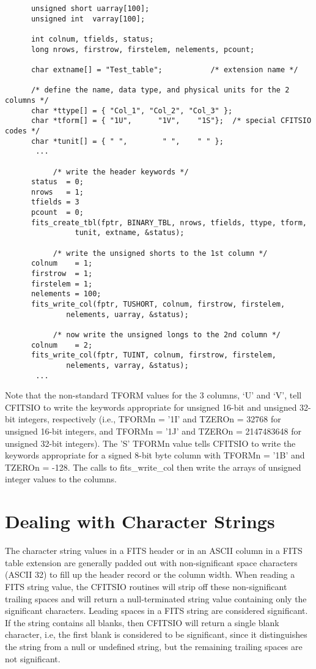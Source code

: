 \documentclass[11pt]{book}
\begin{document}
\begin{verbatim}
      unsigned short uarray[100];
      unsigned int  varray[100];

      int colnum, tfields, status;
      long nrows, firstrow, firstelem, nelements, pcount;

      char extname[] = "Test_table";           /* extension name */

      /* define the name, data type, and physical units for the 2 columns */
      char *ttype[] = { "Col_1", "Col_2", "Col_3" };
      char *tform[] = { "1U",      "1V",    "1S"};  /* special CFITSIO codes */
      char *tunit[] = { " ",        " ",    " " };
       ...

           /* write the header keywords */
      status  = 0;
      nrows   = 1;
      tfields = 3
      pcount  = 0;
      fits_create_tbl(fptr, BINARY_TBL, nrows, tfields, ttype, tform,
                tunit, extname, &status);

           /* write the unsigned shorts to the 1st column */
      colnum    = 1;
      firstrow  = 1;
      firstelem = 1;
      nelements = 100;
      fits_write_col(fptr, TUSHORT, colnum, firstrow, firstelem,
              nelements, uarray, &status);

           /* now write the unsigned longs to the 2nd column */
      colnum    = 2;
      fits_write_col(fptr, TUINT, colnum, firstrow, firstelem,
              nelements, varray, &status);
       ...
\end{verbatim}
Note that the non-standard TFORM values for the 3 columns, `U' and `V',
tell CFITSIO to write the keywords appropriate for unsigned 16-bit and
unsigned 32-bit integers, respectively (i.e., TFORMn = '1I' and TZEROn
= 32768 for unsigned 16-bit integers, and TFORMn = '1J' and TZEROn =
2147483648 for unsigned 32-bit integers).  The 'S' TFORMn value tells
CFITSIO to write the keywords appropriate for a signed 8-bit byte column
with TFORMn = '1B' and TZEROn = -128.  The calls to fits\_write\_col
then write the arrays of unsigned integer values to the columns.


\section{Dealing with Character Strings}

The character string values in a FITS header or in an ASCII column in a
FITS table extension are generally padded out with non-significant
space characters (ASCII 32) to fill up the header record or the column
width.  When reading a FITS string value, the CFITSIO routines will
strip off these non-significant trailing spaces and will return a
null-terminated string value containing only the significant
characters.  Leading spaces in a FITS string are considered
significant.  If the string contains all blanks, then CFITSIO will
return a single blank character, i.e, the first blank is considered to
be significant, since it distinguishes the string from a null or
undefined string, but the remaining trailing spaces are not
significant.
\end{document}
